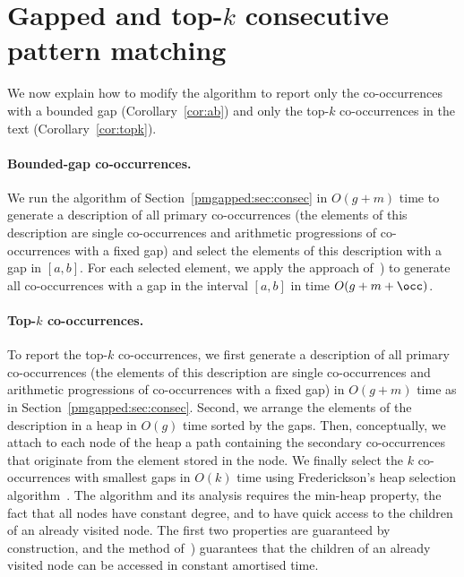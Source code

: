 \section{Gapped and top-\texorpdfstring{$k$}{k} consecutive pattern matching}
We now explain how to modify the algorithm to report only the co-occurrences with a bounded gap (Corollary~\ref{cor:ab}) and only the top-$k$ co-occurrences in the text (Corollary~\ref{cor:topk}).

\paragraph*{Bounded-gap co-occurrences.} We run the algorithm of Section~\ref{pmgapped:sec:consec} in $O(g+m)$ time to generate a description of all primary co-occurrences (the elements of this description are single co-occurrences and arithmetic progressions of co-occurrences with a fixed gap) and select the elements of this description with a gap in $[a,b]$. For each selected element, we apply the approach of~\cite[Section 6.4]{talg/ChristiansenEKN21}) to generate all co-occurrences with a gap in the interval $[a,b]$ in time $O(g+m+\occ)$. 

\paragraph*{Top-$k$ co-occurrences.}
To report the top-$k$ co-occurrences, we first generate a description of all primary co-occurrences (the elements of this description are single co-occurrences and arithmetic progressions of co-occurrences with a fixed gap) in $O(g+m)$ time as in Section~\ref{pmgapped:sec:consec}. Second,  we arrange the elements of the description in a heap in $O(g)$ time sorted by the gaps. Then, conceptually, we attach to each node of the heap a path containing the secondary co-occurrences that originate from the element stored in the node. We finally select the $k$ co-occurrences with smallest gaps in $O(k)$ time using Frederickson's heap selection algorithm~\cite{FREDERICKSON1993197}. The algorithm and its analysis requires the min-heap property, the fact that all nodes have constant degree, and to have quick access to the children of an already visited node. The first two properties are guaranteed by construction, and the method of~\cite[Section 6.4]{talg/ChristiansenEKN21}) guarantees that the children of an already visited node can be accessed in constant amortised time.
